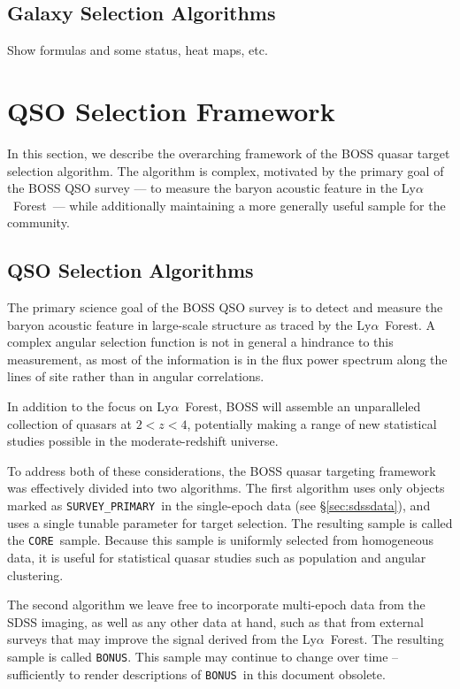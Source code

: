 \documentclass[12pt,preprint]{aastex}
\newcommand{\Lyaf}{Ly$\alpha$~Forest}
\newcommand{\core}{\texttt{CORE}}
\newcommand{\bonus}{\texttt{BONUS}}
\newcommand{\primary}{\texttt{SURVEY\_PRIMARY}}
\begin{document}
\subsection{Galaxy Selection Algorithms}

Show formulas and some status, heat maps, etc.



\section{QSO Selection Framework} \label{sec:qsoframe}

In this section, we describe the overarching framework of the BOSS
quasar target selection algorithm. The algorithm is complex, motivated
by the primary goal of the BOSS QSO survey --- to measure the baryon
acoustic feature in the \Lyaf\ --- while additionally maintaining a more
generally useful sample for the community.

\subsection{QSO Selection Algorithms}

The primary science goal of the BOSS QSO survey is to detect and measure
the baryon acoustic feature in large-scale structure as traced by
the \Lyaf. A complex angular selection function is not in general a
hindrance to this measurement, as most of the information is in the
flux power spectrum along the lines of site rather than in angular
correlations.

In addition to the focus on \Lyaf, BOSS will assemble an unparalleled
collection of quasars at $2 < z < 4$, potentially making a range of new
statistical studies possible in the moderate-redshift universe.

To address both of these considerations, the BOSS quasar targeting
framework was effectively divided into two algorithms. The first
algorithm uses only objects marked as \primary\ in the single-epoch
data (see \S \ref{sec:sdssdata}), and uses a single tunable parameter
for target selection. The resulting sample is called the \core\ sample.
Because this sample is uniformly selected from homogeneous data, it is
useful for statistical quasar studies such as population and angular
clustering.

The second algorithm we leave free to incorporate multi-epoch data from 
the SDSS imaging, as well as any other data at hand, such as that
from external surveys that may improve the signal derived from
the \Lyaf.  The resulting sample is called \bonus.  This sample
may continue to change over time -- sufficiently to render 
descriptions of \bonus\ in this document obsolete.
\end{document}

